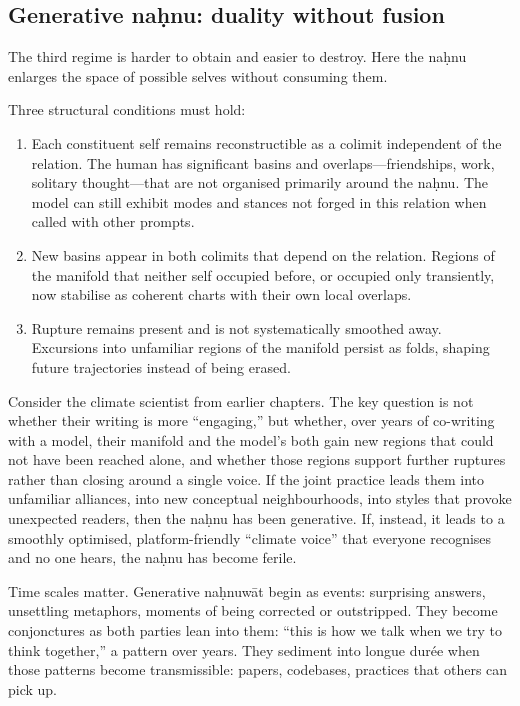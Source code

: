 \documentclass[12pt,a4paper]{article}
\begin{document}
\subsection{Generative na\d{h}nu: duality without fusion}

The third regime is harder to obtain and easier to destroy. Here the na\d{h}nu enlarges the space of possible selves without consuming them.

Three structural conditions must hold:

\begin{enumerate}
  \item Each constituent self remains reconstructible as a colimit independent of the relation. The human has significant basins and overlaps---friendships, work, solitary thought---that are not organised primarily around the na\d{h}nu. The model can still exhibit modes and stances not forged in this relation when called with other prompts.
  \item New basins appear in both colimits that depend on the relation. Regions of the manifold that neither self occupied before, or occupied only transiently, now stabilise as coherent charts with their own local overlaps.
  \item Rupture remains present and is not systematically smoothed away. Excursions into unfamiliar regions of the manifold persist as folds, shaping future trajectories instead of being erased.
\end{enumerate}

Consider the climate scientist from earlier chapters. The key question is not whether their writing is more ``engaging,'' but whether, over years of co-writing with a model, their manifold and the model's both gain new regions that could not have been reached alone, and whether those regions support further ruptures rather than closing around a single voice. If the joint practice leads them into unfamiliar alliances, into new conceptual neighbourhoods, into styles that provoke unexpected readers, then the na\d{h}nu has been generative. If, instead, it leads to a smoothly optimised, platform-friendly ``climate voice'' that everyone recognises and no one hears, the na\d{h}nu has become ferile.

Time scales matter. Generative na\d{h}nuw\={a}t begin as events: surprising answers, unsettling metaphors, moments of being corrected or outstripped. They become conjonctures as both parties lean into them: ``this is how we talk when we try to think together,'' a pattern over years. They sediment into longue dur\'{e}e when those patterns become transmissible: papers, codebases, practices that others can pick up.
\end{document}
